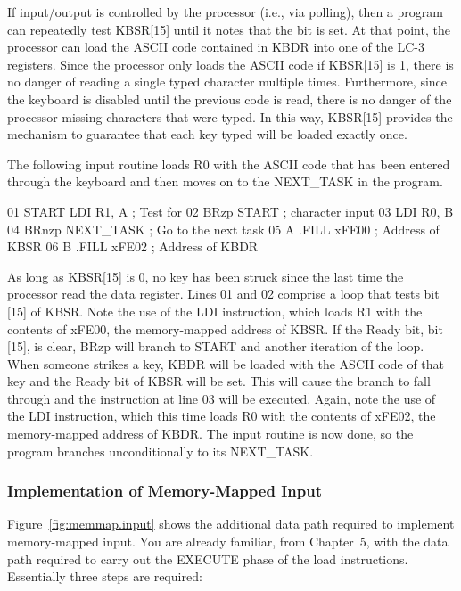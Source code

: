 \documentclass{patt}
\begin{document}
If input/output is controlled by the processor (i.e., via polling),
then a program can repeatedly test KBSR[15] until it notes that the
bit is set. At that point, the processor can load the ASCII code
contained in KBDR into one of the LC-3 registers.  Since the processor
only loads the ASCII code if KBSR[15] is 1, there is no danger of
reading a single typed character multiple times. Furthermore, since
the keyboard is disabled until the previous code is read, there is no
danger of the processor missing characters that were typed. In this
way, KBSR[15] provides the mechanism to guarantee that each key typed
will be loaded exactly once.

The following input routine loads R0 with the ASCII code that has been
entered through the keyboard and then moves on to the NEXT\_TASK in
the program.

\begin{colorverbatim}
01    START  LDI     R1, A        ; Test for
02           BRzp    START        ; character input
03           LDI     R0, B
04           BRnzp   NEXT_TASK    ; Go to the next task
05    A      .FILL   xFE00        ; Address of KBSR
06    B      .FILL   xFE02        ; Address of KBDR
\end{colorverbatim}

\noindent
As long as KBSR[15] is 0, no key has been struck since the last time
the processor read the data register.  Lines 01 and 02 comprise a loop
that tests bit [15] of KBSR.  Note the use of the LDI instruction,
which loads R1 with the contents of xFE00, the memory-mapped address
of KBSR. If the Ready bit, bit [15], is clear, BRzp will branch to
START and another iteration of the loop.  When someone strikes a key,
KBDR will be loaded with the ASCII code of that key and the Ready bit
of KBSR will be set.  This will cause the branch to fall through and
the instruction at line 03 will be executed.  Again, note the use of the
LDI instruction, which this time loads R0 with the contents of xFE02,
the memory-mapped address of KBDR.  The input routine is now done, so
the program branches unconditionally to its NEXT\_TASK.


\subsubsection{Implementation of Memory-Mapped Input}

Figure~\ref{fig:memmap.input} shows the additional data path required
to implement memory-mapped input.  You are already familiar, from
Chapter~5, with the data path required to carry out the EXECUTE phase
of the load instructions.  Essentially three steps are required:
\end{document}
